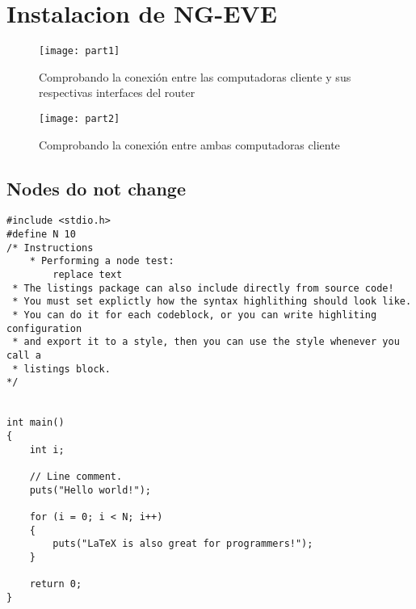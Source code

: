 \documentclass{article} %
\author{\nombre , \carnet}
\title{\titulo}
\begin{document}
\maketitle

\section{Instalacion de NG-EVE}
	\blindtext
	\begin{figure}[h]
		\texttt{[image: part1]}
		 \caption{Comprobando la conexión entre las computadoras cliente y sus respectivas interfaces del router}
	    \label{fig:conn1}
	\end{figure}
	\begin{figure}[h]
		\texttt{[image: part2]}
		\caption{Comprobando la conexión entre ambas computadoras cliente}
	\end{figure}
	\FloatBarrier %
		\subsection{Nodes do not change}
			\blindtext
			\begin{lstlisting}
#include <stdio.h>
#define N 10
/* Instructions 
	* Performing a node test: 
		replace text
 * The listings package can also include directly from source code!
 * You must set explictly how the syntax highlithing should look like.
 * You can do it for each codeblock, or you can write highliting configuration 
 * and export it to a style, then you can use the style whenever you call a 
 * listings block.
*/


int main()
{
    int i;

    // Line comment.
    puts("Hello world!");

    for (i = 0; i < N; i++)
    {
        puts("LaTeX is also great for programmers!");
    }

    return 0;
}
		\end{lstlisting} 
\end{document}
